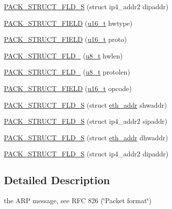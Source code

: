\begin{DoxyCompactItemize}
\item 
\hyperlink{structetharp__hdr_a9014d4d9dd83d01fc9f7af9ed67bfa38}{P\+A\+C\+K\+\_\+\+S\+T\+R\+U\+C\+T\+\_\+\+F\+L\+D\+\_\+S} (struct ip4\+\_\+addr2 dipaddr)
\item 
\hyperlink{structetharp__hdr_a9e768fe69372967f47685000c4b3610c}{P\+A\+C\+K\+\_\+\+S\+T\+R\+U\+C\+T\+\_\+\+F\+I\+E\+LD} (\hyperlink{group__compiler__abstraction_ga77570ac4fcab86864fa1916e55676da2}{u16\+\_\+t} hwtype)
\item 
\hyperlink{structetharp__hdr_a44ab7d21eacebf2c9f566bb4803277ac}{P\+A\+C\+K\+\_\+\+S\+T\+R\+U\+C\+T\+\_\+\+F\+I\+E\+LD} (\hyperlink{group__compiler__abstraction_ga77570ac4fcab86864fa1916e55676da2}{u16\+\_\+t} proto)
\item 
\hyperlink{structetharp__hdr_a1b4df95761337606835bc21163ea6929}{P\+A\+C\+K\+\_\+\+S\+T\+R\+U\+C\+T\+\_\+\+F\+L\+D\+\_} (\hyperlink{group__compiler__abstraction_ga4caecabca98b43919dd11be1c0d4cd8e}{u8\+\_\+t} hwlen)
\item 
\hyperlink{structetharp__hdr_a1b9ea937c307c6957789b32b27425e8f}{P\+A\+C\+K\+\_\+\+S\+T\+R\+U\+C\+T\+\_\+\+F\+L\+D\+\_} (\hyperlink{group__compiler__abstraction_ga4caecabca98b43919dd11be1c0d4cd8e}{u8\+\_\+t} protolen)
\item 
\hyperlink{structetharp__hdr_a3b20d36ae72daac8189ced51d1be27cf}{P\+A\+C\+K\+\_\+\+S\+T\+R\+U\+C\+T\+\_\+\+F\+I\+E\+LD} (\hyperlink{group__compiler__abstraction_ga77570ac4fcab86864fa1916e55676da2}{u16\+\_\+t} opcode)
\item 
\hyperlink{structetharp__hdr_a3a446986ed72900fb5d88d7134677f5c}{P\+A\+C\+K\+\_\+\+S\+T\+R\+U\+C\+T\+\_\+\+F\+L\+D\+\_\+S} (struct \hyperlink{structeth__addr}{eth\+\_\+addr} shwaddr)
\item 
\hyperlink{structetharp__hdr_ada173e74740db9db872ff4deb694df2f}{P\+A\+C\+K\+\_\+\+S\+T\+R\+U\+C\+T\+\_\+\+F\+L\+D\+\_\+S} (struct ip4\+\_\+addr2 sipaddr)
\item 
\hyperlink{structetharp__hdr_a38b79f2bc964169414a9ae3b77f461d5}{P\+A\+C\+K\+\_\+\+S\+T\+R\+U\+C\+T\+\_\+\+F\+L\+D\+\_\+S} (struct \hyperlink{structeth__addr}{eth\+\_\+addr} dhwaddr)
\item 
\hyperlink{structetharp__hdr_a9014d4d9dd83d01fc9f7af9ed67bfa38}{P\+A\+C\+K\+\_\+\+S\+T\+R\+U\+C\+T\+\_\+\+F\+L\+D\+\_\+S} (struct ip4\+\_\+addr2 dipaddr)
\end{DoxyCompactItemize}


\subsection{Detailed Description}
the A\+RP message, see R\+FC 826 (\char`\"{}\+Packet format\char`\"{}) 

